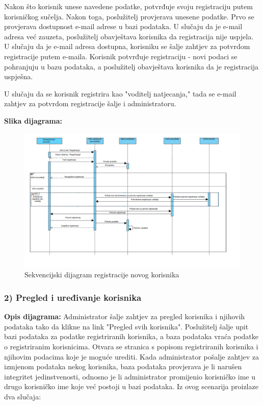 				Nakon što korisnik unese navedene podatke, potvrđuje svoju registraciju putem korisničkog sučelja. Nakon toga, poslužitelj provjerava unesene podatke. Prvo se provjerava dostupnost e-mail adrese u bazi podataka. U slučaju da je e-mail adresa već zauzeta, poslužitelj obavještava korisnika da registracija nije uspjela.
				U slučaju da je e-mail adresa dostupna, korisniku se šalje zahtjev za potvrdom registracije putem e-maila. Korisnik potvrđuje registraciju - novi podaci se pohranjuju u bazu podataka, a poslužitelj obavještava korisnika da je registracija uspješna.
				
				U slučaju da se korisnik registrira kao "voditelj natjecanja," tada se e-mail zahtjev za potvrdom registracije šalje i administratoru. 
				
				\textbf{Slika dijagrama:}
				\begin{figure}[H]
					\includegraphics[scale=0.4]{slike/Registracija}
					\centering
					\caption{Sekvencijski dijagram registracije novog korisnika}
					
				\end{figure}
				
				\subsubsection{2) Pregled i uređivanje korisnika}
				
				\textbf{Opis dijagrama:}
				Administrator šalje zahtjev za pregled korisnika i njihovih podataka tako da klikne na link "Pregled svih korisnika". Poslužitelj šalje upit bazi podataka za podatke registriranih korisnika, a baza podataka vraća podatke o registriranim korisnicima. Otvara se stranica s popisom registriranih korisnika i njihovim podacima koje je moguće urediti. Kada administrator pošalje zahtjev za izmjenom podataka nekog korisnika, baza podataka provjerava je li narušen integritet jedinstvenosti, odnosno je li administrator promijenio korisničko ime u drugo korisničko ime koje već postoji u bazi podataka. Iz ovog scenarija proizlaze dva slučaja:
				
